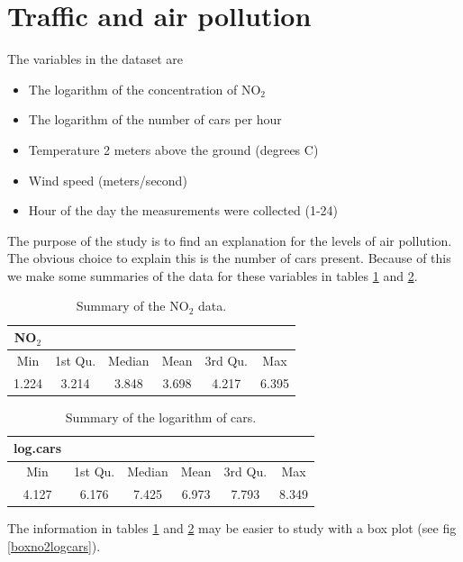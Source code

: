 \documentclass[a4paper]{article}
\begin{document}
\section{Traffic and air pollution}\label{sec:Equations}
The variables in the dataset are 
\begin{itemize}
 \item{The logarithm of the concentration of NO$_2$}
 \item{The logarithm of the number of cars per hour}
 \item{Temperature 2 meters above the ground (degrees C)}
 \item{Wind speed (meters/second)}
 \item{Hour of the day the measurements were collected (1-24)}
\end{itemize}
The purpose of the study is to find an explanation for the levels of air pollution. The obvious choice to explain this is the number of cars present. Because of this we make some summaries of the data for these variables in tables \ref{NO2} and 
\ref{log.cars}.

\begin{table}
\begin{center}
\begin{tabular}{|c|c|c|c|c|c|}
   \hline
   NO$_2$&&&&&\\
   \hline
   Min &1st Qu. & Median& Mean & 3rd Qu. & Max\\
   \hline
   1.224 & 3.214 & 3.848 & 3.698 & 4.217 & 6.395\\
   \hline
 \end{tabular}
 \caption{Summary of the NO$_2$ data.}
 \label{NO2}
\end{center}
\end{table}

\begin{table}
\begin{center}
\begin{tabular}{|c|c|c|c|c|c|}
   \hline
   log.cars&&&&&\\
   \hline
   Min &1st Qu. & Median& Mean & 3rd Qu. & Max\\
   \hline
  4.127 & 6.176 & 7.425&  6.973 & 7.793 & 8.349 \\
   \hline
 \end{tabular}
 \caption{Summary of the logarithm of cars.}
 \label{log.cars}
\end{center}
\end{table}
The information in tables \ref{NO2} and \ref{log.cars} may be easier to study with a box plot (see fig \ref{boxno2logcars}).
\end{document}
